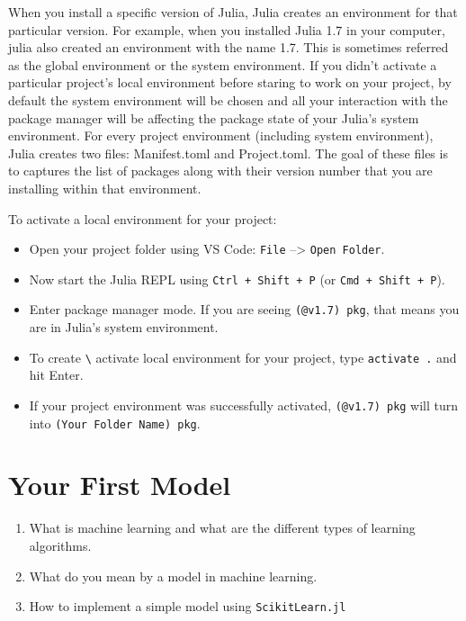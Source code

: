 \documentclass[
  letterpaper,
]{book}
\providecommand{\tightlist}{%
  \setlength{\itemsep}{0pt}\setlength{\parskip}{0pt}}\usepackage{longtable,booktabs,array}
\begin{document}
When you install a specific version of Julia, Julia creates an
environment for that particular version. For example, when you installed
Julia 1.7 in your computer, julia also created an environment with the
name 1.7. This is sometimes referred as the global environment or the
system environment. If you didn't activate a particular project's local
environment before staring to work on your project, by default the
system environment will be chosen and all your interaction with the
package manager will be affecting the package state of your Julia's
system environment. For every project environment (including system
environment), Julia creates two files: Manifest.toml and Project.toml.
The goal of these files is to captures the list of packages along with
their version number that you are installing within that environment.

To activate a local environment for your project:

\begin{itemize}
\tightlist
\item
  Open your project folder using VS Code: \texttt{File} --\textgreater{}
  \texttt{Open\ Folder}.
\item
  Now start the Julia REPL using \texttt{Ctrl\ +\ Shift\ +\ P} (or
  \texttt{Cmd\ +\ Shift\ +\ P}).
\item
  Enter package manager mode. If you are seeing \texttt{(@v1.7)\ pkg},
  that means you are in Julia's system environment.
\item
  To create \texttt{\textbackslash{}} activate local environment for
  your project, type \texttt{activate\ .} and hit Enter.
\item
  If your project environment was successfully activated,
  \texttt{(@v1.7)\ pkg} will turn into
  \texttt{(Your\ Folder\ Name)\ pkg}.
\end{itemize}

\hypertarget{your-first-model}{%
\chapter{Your First Model}\label{your-first-model}}

\begin{tcolorbox}[standard jigsaw,bottomtitle=1mm, titlerule=0mm, title={In this chapter you'll learn:}, leftrule=.75mm, toptitle=1mm, arc=.35mm, rightrule=.15mm, opacitybacktitle=0.6, colframe=quarto-callout-caution-color-frame, bottomrule=.15mm, colbacktitle=quarto-callout-caution-color!10!white, colback=white, toprule=.15mm, left=2mm, coltitle=black, opacityback=0]

\begin{enumerate}
\def\labelenumi{\arabic{enumi}.}
\tightlist
\item
  What is machine learning and what are the different types of learning
  algorithms.
\item
  What do you mean by a model in machine learning.
\item
  How to implement a simple model using \texttt{ScikitLearn.jl}
\end{enumerate}

\end{tcolorbox}
\end{document}
